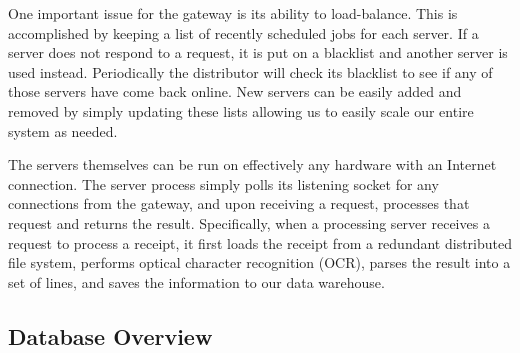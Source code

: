 One important issue for the gateway is its ability to
load-balance. This is accomplished by keeping a list of recently
scheduled jobs for each server. If a server does not respond to a
request, it is put on a blacklist and another server is used
instead. Periodically the distributor will check its blacklist to see
if any of those servers have come back online. New servers can be
easily added and removed by simply updating these lists allowing us to
easily scale our entire system as needed.

The servers themselves can be run on effectively any hardware with an
Internet connection. The server process simply polls its listening
socket for any connections from the gateway, and upon receiving a
request, processes that request and returns the result. Specifically,
when a processing server receives a request to process a receipt, it
first loads the receipt from a redundant distributed file system,
performs optical character recognition (OCR), parses the result into a
set of lines, and saves the information to our data warehouse.

\subsection{Database Overview}
\label{sec:overview.db}

